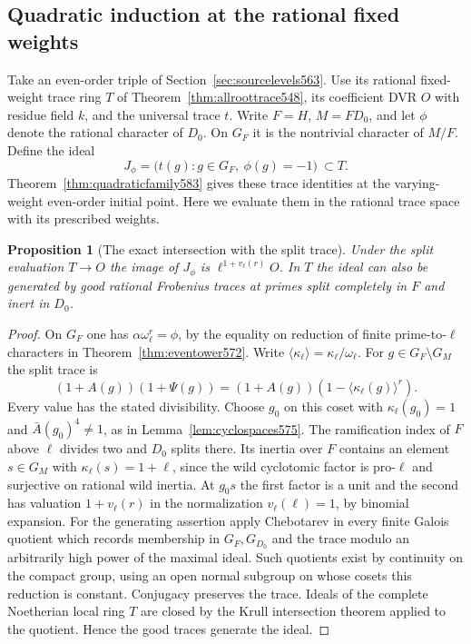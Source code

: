 \documentclass[a4paper,11pt]{article}
\newtheorem{proposition}{Proposition}[section]
\theoremstyle{definition}
\theoremstyle{remark}
\numberwithin{equation}{section}
\begin{document}
\subsection{Quadratic induction at the rational fixed weights}
\label{sec:rationalinduction585}

Take an even-order triple of Section~\ref{sec:sourcelevels563}.
Use its rational fixed-weight trace ring \(T\) of
Theorem~\ref{thm:allroottrace548}, its coefficient DVR \(O\)
with residue field \(k\), and the universal trace \(t\).
Write \(F=H\), \(M=FD_0\), and let \(\phi\) denote the rational
character of \(D_0\). On \(G_F\) it is the nontrivial character
of \(M/F\). Define the ideal
\[
        J_\phi=\bigl(t(g):g\in G_F,\ \phi(g)=-1\bigr)\ \subset T .
\]
Theorem~\ref{thm:quadraticfamily583} gives these trace identities
at the varying-weight even-order initial point. Here we evaluate
them in the rational trace space with its prescribed weights.

\begin{proposition}[The exact intersection with the split trace]
\leavevmode\label{prop:splitinduction585}
Under the split evaluation \(T\to O\) the image of \(J_\phi\)
is \(\ell^{1+v_\ell(r)}O\). In \(T\) the ideal can also be
generated by good rational Frobenius traces at primes split
completely in \(F\) and inert in \(D_0\).
\end{proposition}
\begin{proof}
On \(G_F\) one has \(\alpha\omega_\ell^r=\phi\), by the
equality on reduction of finite prime-to-\(\ell\) characters
in Theorem~\ref{thm:eventower572}. Write
\(\langle\kappa_\ell\rangle=\kappa_\ell/\omega_\ell\).
For \(g\in G_F\setminus G_M\) the split trace is
\[
    (1+A(g))(1+\Psi(g))
       =(1+A(g))(1-\langle\kappa_\ell(g)\rangle^r).
\]
Every value has the stated divisibility. Choose \(g_0\) on
this coset with \(\kappa_\ell(g_0)=1\) and
\(\bar A(g_0)^4\ne1\), as in Lemma~\ref{lem:cyclospaces575}.
The ramification index of \(F\) above \(\ell\) divides two
and \(D_0\) splits there. Its inertia over \(F\) contains
an element \(s\in G_M\) with \(\kappa_\ell(s)=1+\ell\),
since the wild cyclotomic factor is pro-\(\ell\) and
surjective on rational wild inertia. At \(g_0s\) the first
factor is a unit and the second has valuation \(1+v_\ell(r)\)
in the normalization \(v_\ell(\ell)=1\), by binomial expansion.
For the generating assertion apply Chebotarev in every finite
Galois quotient which records membership in \(G_F,G_{D_0}\)
and the trace modulo an arbitrarily high power of the maximal
ideal. Such quotients exist by continuity on the compact group,
using an open normal subgroup on whose cosets this reduction
is constant. Conjugacy preserves the trace. Ideals of the
complete Noetherian local ring \(T\) are closed by the Krull
intersection theorem applied to the quotient. Hence the good
traces generate the ideal.
\end{proof}
\end{document}
